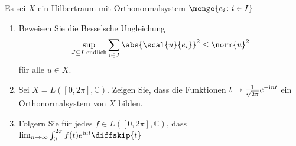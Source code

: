 \begin{exercisePage}
	
\setcounter{taskcount}{12}

\begin{homework}
	Es sei $X$ ein Hilbertraum mit Orthonormalsystem $\menge{e_i \colon i \in I}$
	\begin{enumerate}
		\item Beweisen Sie die Besselsche Ungleichung
		\begin{equation*}
			\sup_{J \subseteq I \text{ endlich}} \sum_{i \in J} \abs{\scal{u}{e_i}}^2 \le \norm{u}^2
		\end{equation*}
		für alle $u \in X$.
		\item Sei $X = L([0,2\pi], \mathbb{C})$. Zeigen Sie, dass die Funktionen $t \mapsto \frac{1}{\sqrt{2\pi}} e^{-\mathrm{i} n t}$ ein Orthonormalsystem von $X$ bilden.
		\item Folgern Sie für jedes $f \in L([0,2\pi], \mathbb{C})$, dass $\lim_{n \to \infty} \int_0^{2\pi} f(t) e^{\i n t} \diffskip{t}$
	\end{enumerate}
\end{homework}


\end{exercisePage}

